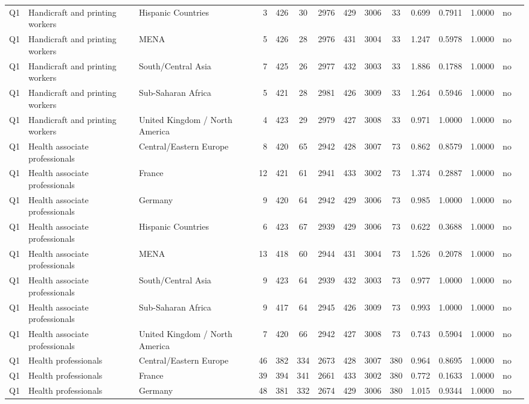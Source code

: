 \begin{longtable}{lllrcccccccccll}
Q1 & Handicraft and printing workers & Hispanic Countries & 3 & 426 & 30 & 2976 & 429 & 3006 & 33 & 0.699 & 0.7911 & 1.0000 & no \\
Q1 & Handicraft and printing workers & MENA & 5 & 426 & 28 & 2976 & 431 & 3004 & 33 & 1.247 & 0.5978 & 1.0000 & no \\
Q1 & Handicraft and printing workers & South/Central Asia & 7 & 425 & 26 & 2977 & 432 & 3003 & 33 & 1.886 & 0.1788 & 1.0000 & no \\
Q1 & Handicraft and printing workers & Sub-Saharan Africa & 5 & 421 & 28 & 2981 & 426 & 3009 & 33 & 1.264 & 0.5946 & 1.0000 & no \\
Q1 & Handicraft and printing workers & United Kingdom / North America & 4 & 423 & 29 & 2979 & 427 & 3008 & 33 & 0.971 & 1.0000 & 1.0000 & no \\
Q1 & Health associate professionals & Central/Eastern Europe & 8 & 420 & 65 & 2942 & 428 & 3007 & 73 & 0.862 & 0.8579 & 1.0000 & no \\
Q1 & Health associate professionals & France & 12 & 421 & 61 & 2941 & 433 & 3002 & 73 & 1.374 & 0.2887 & 1.0000 & no \\
Q1 & Health associate professionals & Germany & 9 & 420 & 64 & 2942 & 429 & 3006 & 73 & 0.985 & 1.0000 & 1.0000 & no \\
Q1 & Health associate professionals & Hispanic Countries & 6 & 423 & 67 & 2939 & 429 & 3006 & 73 & 0.622 & 0.3688 & 1.0000 & no \\
Q1 & Health associate professionals & MENA & 13 & 418 & 60 & 2944 & 431 & 3004 & 73 & 1.526 & 0.2078 & 1.0000 & no \\
Q1 & Health associate professionals & South/Central Asia & 9 & 423 & 64 & 2939 & 432 & 3003 & 73 & 0.977 & 1.0000 & 1.0000 & no \\
Q1 & Health associate professionals & Sub-Saharan Africa & 9 & 417 & 64 & 2945 & 426 & 3009 & 73 & 0.993 & 1.0000 & 1.0000 & no \\
Q1 & Health associate professionals & United Kingdom / North America & 7 & 420 & 66 & 2942 & 427 & 3008 & 73 & 0.743 & 0.5904 & 1.0000 & no \\
Q1 & Health professionals & Central/Eastern Europe & 46 & 382 & 334 & 2673 & 428 & 3007 & 380 & 0.964 & 0.8695 & 1.0000 & no \\
Q1 & Health professionals & France & 39 & 394 & 341 & 2661 & 433 & 3002 & 380 & 0.772 & 0.1633 & 1.0000 & no \\
Q1 & Health professionals & Germany & 48 & 381 & 332 & 2674 & 429 & 3006 & 380 & 1.015 & 0.9344 & 1.0000 & no \\

\end{longtable}
